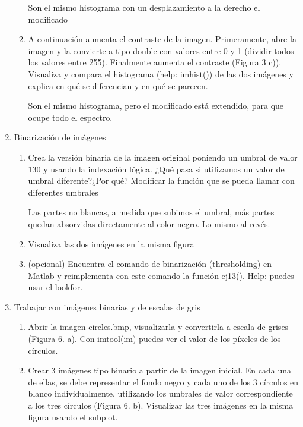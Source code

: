 \documentclass[a4paper,10pt]{article}
\begin{document}
\begin{enumerate}
\begin{enumerate}
  Son el mismo histograma con un desplazamiento a la derecho el modificado

  \item A  continuación  aumenta el  contraste  de  la  imagen. 
Primeramente, abre  la  imagen  y  la  convierte a  tipo  double  con  valores 
entre 0  y 1  (dividir  todos los  valores entre 255). Finalmente aumenta el 
contraste (Figura  3  c)). Visualiza y compara el histograma (help: imhist()) de las dos imágenes y 
explica en qué se diferencian y en qué se parecen.

  Son el mismo histograma, pero el modificado está extendido, para que ocupe todo el espectro.
  
 \end{enumerate}

 \item  Binarización de imágenes
 
 \begin{enumerate}
  \item Crea la versión binaria de la imagen original poniendo un umbral de 
valor  130 y  usando  la  indexación  lógica.  ¿Qué  pasa  si  utilizamos  un 
valor de umbral diferente?¿Por qué? Modificar la función que se pueda 
llamar con diferentes umbrales

  Las partes no blancas, a medida que subimos el umbral, más partes quedan absorvidas directamente al color negro. Lo mismo al revés.

  \item Visualiza las dos imágenes en la misma figura
  
  \item (opcional) Encuentra  el  comando  de  binarización  (thresholding)  en  Matlab  y 
reimplementa con este comando la  función ej13(). Help: puedes usar 
el lookfor.


 \end{enumerate}

 \item Trabajar con imágenes binarias y de escalas de gris 
 
 \begin{enumerate}
  \item  Abrir la imagen circles.bmp, visualizarla y convertirla a escala de grises (Figura 
6. a). Con imtool(im) puedes ver el valor de los píxeles de los círculos.
  
  \item Crear  3  imágenes  tipo  binario a  partir  de  la  imagen  inicial.  En  cada  una  de 
ellas, se debe representar el  fondo negro y cada uno de los 3 círculos en blanco 
individualmente,  utilizando  los  umbrales  de  valor  correspondiente  a  los  tres 
círculos (Figura 6. b). Visualizar las  tres imágenes en la misma  figura usando el 
subplot.


\end{enumerate}
\end{enumerate}
\end{document}
